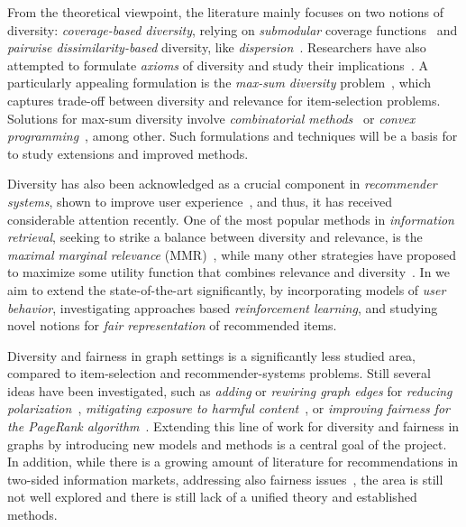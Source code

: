 \documentclass[a4paper,11pt]{article}
\begin{document}
From the theoretical viewpoint, the literature mainly focuses on two notions of diversity: 
\emph{coverage-based diversity}, relying on \emph{submodular} coverage functions~\cite{bach2013learning} 
and \emph{pairwise dissimilarity-based} diversity, like \emph{dispersion}~\cite{hassin1997approximation}.
Researchers have also attempted to formulate \emph{axioms} of diversity and study
their implications~\cite{gollapudi2009axiomatic}. 
A particularly appealing formulation is the \emph{max-sum diversity} problem~\cite{borodin2012max},
which captures trade-off between diversity and relevance for item-selection problems.
Solutions for max-sum diversity involve \emph{combinatorial methods}~\cite{borodin2012max} or
\emph{convex programming}~\cite{cevallos2016max}, 
among other.
Such formulations and techniques will be a basis for {\acronym}
to study extensions and improved methods. 


Diversity has also been acknowledged as a crucial component in \emph{recommender systems},
shown to improve user experience~\cite{Castells2022}, 
and thus, it has received considerable attention recently. 
One of the most popular methods in \emph{information retrieval},
seeking to strike a balance between diversity and relevance, 
is the \emph{maximal marginal relevance} (MMR)~\cite{MMR}, 
while many other strategies have proposed to 
maximize some utility function that combines relevance and diversity~\cite{DUM,DPMF}.
In \acronym we aim to extend the state-of-the-art significantly, 
by incorporating models of \emph{user behavior}, 
investigating approaches based \emph{reinforcement learning}, 
and studying novel notions for \emph{fair representation} of recommended items. 


Diversity and fairness in graph settings is a significantly less studied area,
compared to item-selection and recommender-systems problems.
Still several ideas have been investigated, 
such as \emph{adding} or \emph{rewiring graph edges} for
\emph{reducing polarization}~\cite{adriaens2023minimizing,cinus2023rebalancing,haddadan2022reducing},
\emph{mitigating exposure to harmful content}~\cite{coupette2023reducing,fabbri2022rewiring}, 
or \emph{improving fairness for the Page\-Rank algorithm}~\cite{tsioutsiouliklis2022link}.
Extending this line of work for diversity and fairness in graphs
by introducing new models and methods
is a central goal of the \acronym project.
In addition, while there is a growing amount of literature for 
recommendations in two-sided information markets,
addressing also fairness issues~\cite{do2021two,wang2021user}, 
the area is still not well explored and there is still lack of a unified theory
and established methods.
\end{document}
